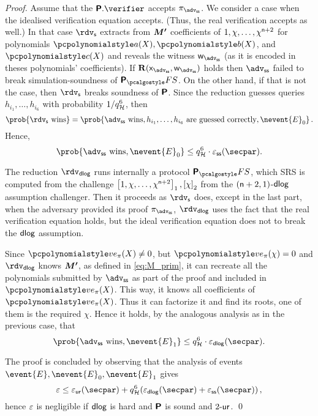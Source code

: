 \documentclass[runningheads,11pt]{llncs}
\def\vec#1{\mathchoice{\mbox{\boldmath$\displaystyle#1$}}
{\mbox{\boldmath$\textstyle#1$}} {\mbox{\boldmath$\scriptstyle#1$}}
{\mbox{\boldmath$\scriptscriptstyle#1$}}}
\theoremstyle{definition} \newtheorem{definition}[theorem]{Definition}
\begin{document}
\begin{proof}
  Assume that the $\plonkprot.\verifier$ accepts $\zkproof_\advss$. We consider
  a case when the idealised verification equation accepts. (Thus, the real
  verification accepts as well.) In that case $\rdvs$ extracts from $\vec{M'}$
  coefficients of $1, \chi, \ldots, \chi^{\mathsf{n} + 2}$ for
  polynomials $\p{a}(X), \p{b}(X)$, and $\p{c}(X)$ and reveals the witness
  $\wit_\advss$ (as it is encoded in theses polynomials' coefficients). If
  $\REL(\inp_\advss, \wit_\advss)$ holds then $\advss$ failed to break
  simulation-soundness of $\plonkprotfs$. On the other hand, if that is not the
  case, then $\rdvs$ breaks soundness of $\bm{\mathsf{P}}$.
  Since the reduction guesses queries $h_{i_1}, \ldots, h_{i_6}$ with
  probability $1/q_{\mathcal{H}}^6$, then
  \[
    \prob{\rdvs \text{ wins}} = \prob{\advss \text{ wins}, h_{i_1}, \ldots,
      h_{i_6} \text{ are guessed correctly}, \nevent{E}_0}\,.
  \]
  Hence,
  \[
    \prob{\advss \text{ wins}, \nevent{E}_0} \leq q_\ro^6 \cdot \epsss(\secpar).
  \]

   The reduction $\rdvdlog$ runs internally a
  protocol $\plonkprotfs$, which SRS is computed from the challenge
  $\left[1, \chi, \ldots, \chi^{\mathsf{n} + 2}\right]_{1}, \left[\chi\right]_{2}$ from the
  $(\mathsf{n} + 2, 1)$-$\mathsf{dlog}$ assumption challenger. Then it proceeds
  as $\rdvs$ does, except in the last part, when the adversary provided its
  proof $\zkproof_\advss$, $\rdvdlog$ uses the fact that the real verification
  equation holds, but the ideal verification equation does not to break the
  $\mathsf{dlog}$ assumption.

  Since $\vereq_\zkproof(X) \neq 0$, but $\vereq_\zkproof(\chi) = 0$ and $\rdvdlog$ knows
  $\vec{M'}$, as defined in \cref{eq:M_prim}, it can recreate all the
  polynomials submitted by $\advss$ as part of the proof and included in
  $\vereq_\zkproof(X)$. This way, it knows all coefficients of $\vereq_\zkproof(X)$. Thus it can
  factorize it and find its roots, one of them is the required $\chi$. Hence it
  holds, by the analogous analysis as in the previous case, that
  \[
    \prob{\advss \text{ wins}, \nevent{E}_1} \leq q_\ro^6 \cdot
    \eps_{\dlog}(\secpar).
  \]

  The proof is concluded by observing that the analysis of events
  $\event{E}, \nevent{E}_0, \nevent{E}_1$ gives
  \[
    \eps \leq \epsur(\secpar) + q_\ro^6 (\eps_{\dlog}(\secpar) +
    \epsss(\secpar))\,,
  \]
  hence $\varepsilon$ is negligible if $\mathsf{dlog}$ is hard and $\bm{\mathsf{P}}$ is sound and
  ${2\text{-}\mathsf{ur}}$.  \qed
\end{proof}
\end{document}
